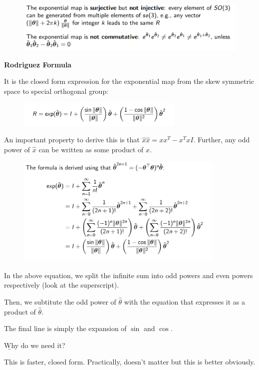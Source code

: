 \begin{figure}[h]\centering\includegraphics[width=12cm]{img/j_3_15.png}\end{figure}

\textbf{Rodriguez Formula}

It is the closed form expression for the exponential map from the skew symmetric space to special orthogonal group:

\begin{figure}[h]\centering\includegraphics[width=8cm]{img/j_3_16.png}\end{figure}

An important property to derive this is that $\hat{x}\hat{x} = xx^T - x^TxI$. Further, any odd power of $\hat{x}$ can be written as some product of $x$. 

\clearpage

\begin{figure}[h]\centering\includegraphics[width=10cm]{img/j_3_17.png}\end{figure}

In the above equation, we split the infinite sum into odd powers and even powers respectively (look at the superscript). 

Then, we subtitute the odd power of $\hat{\theta}$ with the equation that expresses it as a product of $\hat{\theta}$. 

The final line is simply the expansion of $\sin$ and $\cos$. 

\b{Why do we need it?}

This is faster, closed form. Practically, doesn't matter but this is better obviously.

